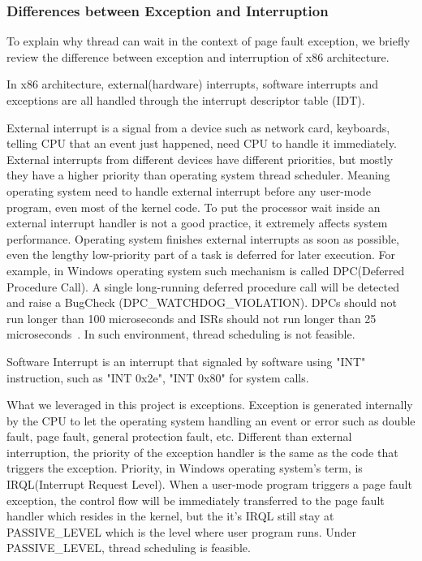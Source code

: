 \subsubsection{Differences between Exception and Interruption}

To explain why thread can wait in the context of page fault exception, we briefly review the difference between exception and interruption of x86 architecture.

In x86 architecture, external(hardware) interrupts, software interrupts and exceptions are all handled through the interrupt descriptor table (IDT). 

External interrupt is a signal from a device such as network card, keyboards, telling CPU that an event just happened, need CPU to handle it immediately. External interrupts from different devices have different priorities, but mostly they have a higher priority than operating system thread scheduler. Meaning operating system need to handle external interrupt before any user-mode program, even most of the kernel code. To put the processor wait inside an external interrupt handler is not a good  practice, it extremely affects system performance. Operating system finishes external interrupts as soon as possible, even the lengthy low-priority part of a task is deferred for later execution. For example, in Windows operating system such mechanism is called DPC(Deferred Procedure Call). A single long-running deferred procedure call will be detected and raise a BugCheck (DPC\_WATCHDOG\_VIOLATION). DPCs should not run longer than 100 microseconds and ISRs should not run longer than 25 microseconds~\cite{msdnwatchdog}. In such environment, thread scheduling is not feasible.

Software Interrupt is an interrupt that signaled by software using "INT" instruction, such as "INT 0x2e", "INT 0x80" for system calls. 

What we leveraged in this project is exceptions. Exception is generated internally by the CPU to let the operating system handling an event or error such as double fault, page fault, general protection fault, etc. Different than external interruption, the priority of the exception handler is the same as the code that triggers the exception. Priority, in Windows operating system's term, is IRQL(Interrupt Request Level). When a user-mode program triggers a page fault exception, the control flow will be immediately transferred to the page fault handler which resides in the kernel, but the it's IRQL still stay at PASSIVE\_LEVEL which is the level where user program runs. Under PASSIVE\_LEVEL, thread scheduling is feasible.


